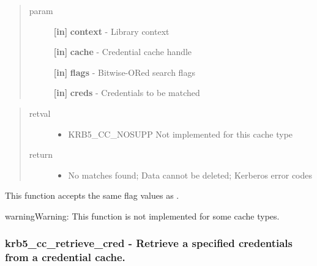 \documentclass[letterpaper,10pt,english]{sphinxmanual}
\begin{document}
\begin{quote}\begin{description}
\item[{param}] \leavevmode
\textbf{{[}in{]}} \textbf{context} - Library context

\textbf{{[}in{]}} \textbf{cache} - Credential cache handle

\textbf{{[}in{]}} \textbf{flags} - Bitwise-ORed search flags

\textbf{{[}in{]}} \textbf{creds} - Credentials to be matched

\end{description}\end{quote}
\begin{quote}\begin{description}
\item[{retval}] \leavevmode\begin{itemize}
\item {} 
KRB5\_CC\_NOSUPP   Not implemented for this cache type

\end{itemize}

\item[{return}] \leavevmode\begin{itemize}
\item {} 
No matches found; Data cannot be deleted; Kerberos error codes

\end{itemize}

\end{description}\end{quote}

This function accepts the same flag values as {\hyperref[appdev/refs/api/krb5_cc_retrieve_cred:c.krb5_cc_retrieve_cred]{}} .

\begin{notice}{warning}{Warning:}
This function is not implemented for some cache types.
\end{notice}


\subsubsection{krb5\_cc\_retrieve\_cred -  Retrieve a specified credentials from a credential cache.}
\label{appdev/refs/api/krb5_cc_retrieve_cred:krb5-cc-retrieve-cred-retrieve-a-specified-credentials-from-a-credential-cache}\label{appdev/refs/api/krb5_cc_retrieve_cred::doc}
\end{document}
